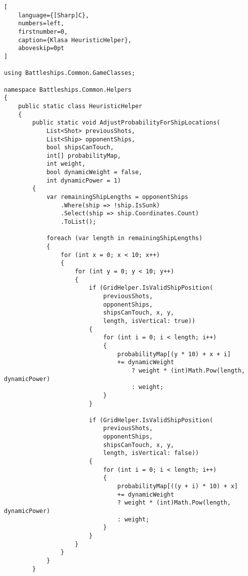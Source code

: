 \begin{addmargin}[0mm]{0mm}
\begin{lstlisting}[
    language={[Sharp]C},
    numbers=left,
    firstnumber=0,
    caption={Klasa HeuristicHelper},
    aboveskip=0pt
]

using Battleships.Common.GameClasses;

namespace Battleships.Common.Helpers
{
    public static class HeuristicHelper
    {
        public static void AdjustProbabilityForShipLocations(
            List<Shot> previousShots,
            List<Ship> opponentShips,
            bool shipsCanTouch,
            int[] probabilityMap,
            int weight,
            bool dynamicWeight = false,
            int dynamicPower = 1)
        {
            var remainingShipLengths = opponentShips
                .Where(ship => !ship.IsSunk)
                .Select(ship => ship.Coordinates.Count)
                .ToList();

            foreach (var length in remainingShipLengths)
            {
                for (int x = 0; x < 10; x++)
                {
                    for (int y = 0; y < 10; y++)
                    {
                        if (GridHelper.IsValidShipPosition(
                            previousShots,
                            opponentShips,
                            shipsCanTouch, x, y,
                            length, isVertical: true))
                        {
                            for (int i = 0; i < length; i++)
                            {
                                probabilityMap[(y * 10) + x + i]
                                += dynamicWeight 
                                    ? weight * (int)Math.Pow(length, dynamicPower) 
                                    : weight;
                            }
                        }

                        if (GridHelper.IsValidShipPosition(
                            previousShots,
                            opponentShips,
                            shipsCanTouch, x, y,
                            length, isVertical: false))
                        {
                            for (int i = 0; i < length; i++)
                            {
                                probabilityMap[((y + i) * 10) + x]
                                += dynamicWeight
                                ? weight * (int)Math.Pow(length, dynamicPower)
                                : weight;
                            }
                        }
                    }
                }
            }
        }


\end{lstlisting}
\end{addmargin}
